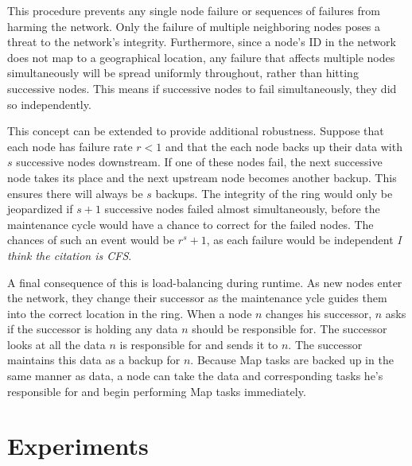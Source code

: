 \documentclass[10pt, conference, compsocconf]{IEEEtran}
\begin{document}
This procedure prevents any single node failure or sequences of failures from harming the network. Only the failure of multiple neighboring nodes poses a threat to the network's integrity.  Furthermore, since a node's ID in the network does not map to a geographical location, any failure that affects multiple nodes simultaneously will be spread uniformly throughout, rather than hitting successive nodes.  This means if successive nodes to fail simultaneously, they did so independently.

This concept can be extended to provide additional robustness.  Suppose that each node has failure rate $r < 1$ and that the each node backs up their data with $s$ successive nodes downstream. If one of these nodes fail, the next successive node takes its place and the next upstream node becomes another backup. This ensures there will always be $s$ backups. The integrity of the ring would only be jeopardized if $s+1$ successive nodes failed almost simultaneously, before the maintenance cycle would have a chance to correct for the failed nodes.  The chances of such an event would be $r^s+1$, as each failure would be independent \textit{I think the citation is CFS}.


A final consequence of this is load-balancing during runtime.  As new nodes enter the network, they change their successor as the maintenance  ycle guides them into the correct location in the ring.  When a node $n$ changes his successor, $n$ asks if the successor is holding any data $n$ should be responsible for.  The successor looks at all the data $n$ is responsible for and sends it to $n$.  The successor maintains this data as a backup for $n$.  Because Map tasks are backed up in the same manner as data, a node can take the data and corresponding tasks he's responsible for and begin performing Map tasks immediately.





\section{Experiments}
\end{document}
